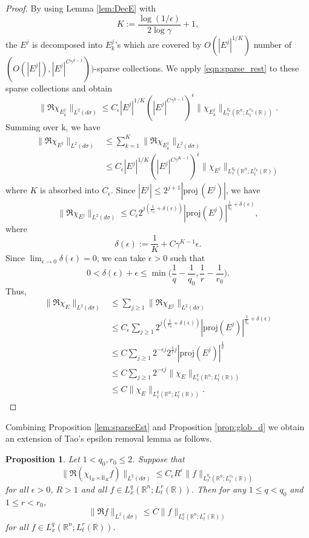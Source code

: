 \documentclass[11pt,reqno]{amsart}
\theoremstyle{plain}
\newtheorem{prop}[thm]{Proposition}
\theoremstyle{definition}
\theoremstyle{remark}
\numberwithin{equation}{section}
\begin{document}
\begin{proof}
By using Lemma \ref{lem:DecE} with 
\[
K := \frac{\log(1/\epsilon)}{2\log \gamma}  + 1,
\] 
the $E^j$ is decomposed into $E^j_k$'s which are covered by $O(|E^j|^{1/K})$ number of $(O(|E^j|),|E^j|^{C\gamma^{k-1}}))$-sparse collections. We apply \eqref{eqn:sparse_rest} to these sparse collections and obtain
    $$
    \|\mathfrak R \chi_{E^j_k} \|_{L^2(d\sigma)}
    \leq C_{\epsilon} |E^j|^{1/K} (|E^j|^{C\gamma^{k-1}})^{\epsilon}  \|\chi_{E^j_k} \|_{L_x^{q_0}(\mathbb R^n ; L_t^{r_0}(\mathbb R))}.
    $$
Summing over k, we have
    \begin{align*}
    \|\mathfrak R \chi_{E^j} \|_{L^2(d\sigma)}
    &\leq \sum_{k=1}^K \|\mathfrak R \chi_{E^j_k} \|_{L^2(d\sigma)} \\
    &\leq C_{\epsilon}  |E^j|^{1/K} (|E^j|^{C\gamma^{K-1}})^{\epsilon} \|\chi_{E^j} \|_{L_x^{q_0}(\mathbb R^n ; L_t^{r_0}(\mathbb R))}
    \end{align*}
where $K$ is absorbed into $C_\epsilon$.
Since $|E^j| \leq 2^{j+1} |\mathrm{proj\,} (E^j)|$, we have
    \[
    \|\mathfrak R \chi_{E^j} \|_{L^2(d\sigma)}
    \le C_{\epsilon} 2^{j(\frac{1}{r_0} + \delta(\epsilon) )} |\mathrm{proj} (E^j)|^{\frac{1}{q_0} + \delta(\epsilon)},
    \]
where  
\[
\delta(\epsilon) :=\frac{1}{K} +C\gamma^{K-1}\epsilon.
\]
Since $\lim_{\epsilon \to 0}\delta(\epsilon) = 0$,
we can take $\epsilon >0$ such that
\[
0< \delta(\epsilon)+\epsilon \le \min \bigg(\frac{1}{q}-\frac{1}{q_0}, \frac{1}{r} - \frac{1}{r_0} \bigg).
\]
Thus,
    \begin{align*}
    \|\mathfrak R \chi_E \|_{L^2(d\sigma)}
    &\leq \sum_{j\geq1} \|\mathfrak R \chi_{E^j} \|_{L^2(d\sigma)} \\
    &\leq C_{\epsilon} \sum_{j\geq1} 2^{j(\frac{1}{r_0} + \delta(\epsilon))} |\mathrm{proj} (E^j)|^{\frac{1}{q_0} + \delta(\epsilon)}\\
&\leq C  \sum_{j\geq1} 2^{-\epsilon j} 2^{\frac{1}{r} j} |\mathrm{proj} (E^j)|^{\frac{1}{q}} \\
&\leq C  \sum_{j\geq1} 2^{-\epsilon j} \|\chi_{E}\|_{L_x^{q}(\mathbb R^n;L_t^{r}(\mathbb R))}  \\
 &\leq C \|\chi_{E}\|_{L_x^{q}(\mathbb R^n;L_t^{r}(\mathbb R))}.
\end{align*}
\end{proof}

Combining Proposition \ref{lem:sparseEst} and Proposition \ref{prop:glob_d} we obtain an extension of Tao's epsilon removal lemma as follows.
\begin{prop}\label{eps_remv}
Let $1 < q_0,r_0 \leq 2$.
Suppose that
    $$
    \|\mathfrak R(\chi_{\mathbb{I}_R \times \mathbb B_R} f) \|_{L^2(d\sigma)}
    \leq C_{\epsilon} R^{\epsilon} \|f\|_{L_{x}^{q_0}(\mathbb R^n;L_{t}^{r_0}(\mathbb R))}
    $$
for all $\epsilon>0$, $R>1$ and all $f \in L_{x}^{q}(\mathbb R^n;L_{t}^{ r}(\mathbb R))$.
Then for any $1\leq q < q_0$ and $1\leq r < r_0$, 
    $$
    \| \mathfrak R f \|_ {L^{2}(d\sigma)}\le C\|f\|_{L_x^{q}(\mathbb R^n; L_t^{r}(\mathbb R) )}
    $$
for all $f \in L_x^{q}(\mathbb R^n; L_t^{r}(\mathbb R) )$.
\end{prop}
\end{document}
